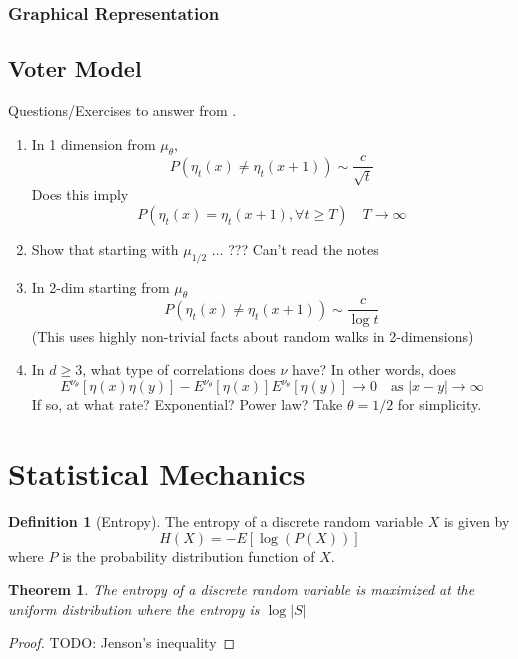 \documentclass{article}
\theoremstyle{plain}
\newtheorem{theorem}{Theorem}[section]
\theoremstyle{definition}
\newtheorem{defn}{Definition}[section]
\theoremstyle{remark}
\begin{document}
\subsubsection{Graphical Representation}

\subsection{Voter Model}

Questions/Exercises to answer from \cite{steif1991}.
\begin{enumerate}
    \item In 1 dimension from $\mu_\theta$,
    $$
    P(\eta_t(x) \not = \eta_t(x + 1)) \sim \frac{c}{\sqrt{t}}
    $$
    Does this imply
    $$
    P(\eta_t(x) = \eta_t(x + 1), \forall t \geq T) \quad T \to \infty
    $$
    \item Show that starting with $\mu_{1/2}$ ...  ??? Can't read the notes
    \item In 2-dim starting from $\mu_\theta$
        $$
    P(\eta_t(x) \not = \eta_t(x + 1)) \sim \frac{c}{\log{t}}
    $$
    (This uses highly non-trivial facts about random walks in 2-dimensions)
    \item In $d \geq 3$, what type of correlations does $\nu$ have?
    In other words, does
    $$
    E^{\nu_\theta}[\eta(x) \eta(y)] - E^{\nu_\theta}[\eta(x)] E^{\nu_\theta}[\eta(y)] \longrightarrow 0 \quad \text{as } |x - y| \to \infty
    $$
    If so, at what rate? Exponential? Power law? Take $\theta = 1/2$ for simplicity.
\end{enumerate}

\section{Statistical Mechanics}

\begin{defn}[Entropy]
    The entropy of a discrete random variable $X$ is given by
    $$
    H(X) = -E[\log(P(X))]
    $$
    where $P$ is the probability distribution function of $X$.
\end{defn}

\begin{theorem}
The entropy of a discrete random variable is maximized at the uniform distribution where the entropy is $\log |S|$
\end{theorem}

\begin{proof}
TODO: Jenson's inequality
\end{proof}



\end{document}
